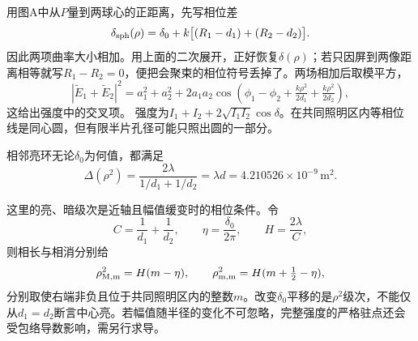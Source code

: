 \documentclass[UTF8,fontset=fandol,a4paper,11pt]{ctexart}
\begin{document}
用图A中从$P$量到两球心的正距离，先写相位差
\[
\delta_{\rm sph}(\rho)
=\delta_0+k\big[(R_1-d_1)+(R_2-d_2)\big].
\]
因此两项曲率大小相加。用上面的二次展开，正好恢复$\delta(\rho)$；若只因屏到两像距离相等就写$R_1-R_2=0$，便把会聚束的相位符号丢掉了。两场相加后取模平方，
\[
|\widetilde E_1+\widetilde E_2|^2
=a_1^2+a_2^2+2a_1a_2\cos(\phi_1-\phi_2+
\tfrac{k\rho^2}{2d_1}+\tfrac{k\rho^2}{2d_2}),
\]
这给出强度中的交叉项。
强度为$I_1+I_2+2\sqrt{I_1I_2}\cos\delta$。在共同照明区内等相位线是同心圆，但有限半片孔径可能只照出圆的一部分。

相邻亮环无论$\delta_0$为何值，都满足
\[
\boxed{\Delta(\rho^2)=\frac{2\lambda}{1/d_1+1/d_2}=\lambda d
=4.210526\times10^{-9}\,\mathrm{m^2}}.
\]

这里的亮、暗级次是近轴且幅值缓变时的相位条件。令
\[
C=\frac1{d_1}+\frac1{d_2},\qquad
\eta=\frac{\delta_0}{2\pi},\qquad H=\frac{2\lambda}{C},
\]
则相长与相消分别给
\[
\rho_{\rm M,m}^2=H(m-\eta),\qquad
\rho_{\rm m,m}^2=H(m+\tfrac12-\eta),
\]
分别取使右端非负且位于共同照明区内的整数$m$。改变$\delta_0$平移的是$\rho^2$级次，不能仅从$d_1=d_2$断言中心亮。若幅值随半径的变化不可忽略，完整强度的严格驻点还会受包络导数影响，需另行求导。
\end{document}
